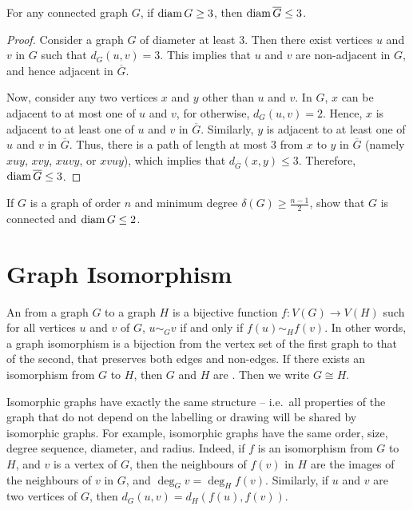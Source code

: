 \begin{Theorem}\label{thm:Diam>=3}
For any connected graph $G$, if $\operatorname{diam} G \ge 3$, then $\operatorname{diam} \overline G \le 3$.
\end{Theorem}

\begin{proof}
Consider a graph $G$ of diameter at least $3$. Then there exist vertices $u$ and $v$ in $G$ such that $d_G(u, v) = 3$. This implies that $u$ and $v$ are non-adjacent in $G$, and hence adjacent in $\overline G$.

Now, consider any two vertices $x$ and $y$ other than $u$ and $v$. In $G$, $x$ can be adjacent to at most one of $u$ and $v$, for otherwise, $d_G(u,v) = 2$. Hence, $x$ is adjacent to at least one of $u$ and $v$ in $\overline G$. Similarly, $y$ is adjacent to at least one of $u$ and $v$ in $\overline G$. Thus, there is a path of length at most $3$ from $x$ to $y$ in $\overline G$ (namely $xuy$, $xvy$, $xuvy$, or $xvuy$), which implies that $d_{\overline G}(x, y) \le 3$. Therefore, $\operatorname{diam} \overline G \le 3$.
\end{proof}

\begin{Exercise}
If $G$ is a graph of order $n$ and minimum degree $\delta(G) \ge \frac{n-1}{2}$, show that $G$ is connected and $\operatorname{diam} G \le 2$.
\end{Exercise}


\section{Graph Isomorphism}\label{sec:Isomorphism}

An  from a graph $G$ to a graph $H$ is a bijective function $f \colon V(G) \to V(H)$ such for all vertices $u$ and $v$ of $G$, $u \sim_G v$ if and only if $f(u) \sim_H f(v)$. In other words, a graph isomorphism is a bijection from the vertex set of the first graph to that of the second, that preserves both edges and non-edges. If there exists an isomorphism from $G$ to $H$, then $G$ and $H$ are . Then we write $G \cong H$.

Isomorphic graphs have exactly the same structure -- i.e.\ all properties of the graph that do not depend on the labelling or drawing will be shared by isomorphic graphs. For example, isomorphic graphs have the same order, size, degree sequence, diameter, and radius. Indeed, if $f$ is an isomorphism from $G$ to $H$, and $v$ is a vertex of $G$, then the neighbours of $f(v)$ in $H$ are the images of the neighbours of $v$ in $G$, and $\deg_G v = \deg_H f(v)$. Similarly, if $u$ and $v$ are two vertices of $G$, then $d_G(u, v) = d_H(f(u), f(v))$.

